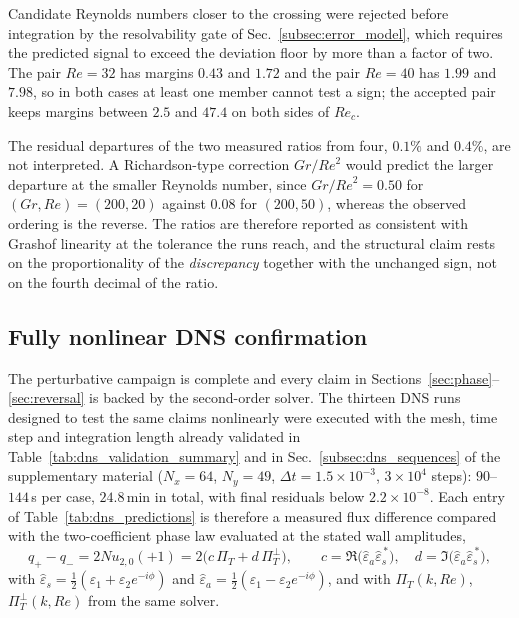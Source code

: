\documentclass[12pt,a4paper]{article}
\newcommand{\Rey}{\mathit{Re}}
\newcommand{\Grr}{\mathit{Gr}}
\newcommand{\Nu}{\mathit{Nu}}
\newcommand{\PiT}{\Pi_T}
\begin{document}
Candidate Reynolds numbers closer to the crossing
were rejected before integration by the resolvability gate of
Sec.~\ref{subsec:error_model}, which requires the predicted signal to exceed
the deviation floor by more than a
factor of two. The pair $\Rey=32$ has margins $0.43$ and $1.72$ and the pair
$\Rey=40$ has $1.99$ and $7.98$, so in both cases at least one member cannot
test a sign; the accepted pair keeps margins between $2.5$ and $47.4$ on both
sides of $\Rey_c$.

The residual departures of the two measured ratios from four, $0.1\%$ and $0.4\%$, are not
interpreted. A Richardson-type correction
$\Grr/\Rey^{2}$ would predict the larger departure at the smaller Reynolds
number, since $\Grr/\Rey^{2}=0.50$ for $(\Grr,\Rey)=(200,20)$ against $0.08$ for $(200,50)$,
whereas the observed ordering is the reverse. The ratios are therefore reported
as consistent with Grashof linearity at the tolerance the runs reach, and
the structural claim rests on the proportionality of the \emph{discrepancy}
together with the unchanged sign, not on the fourth decimal of the ratio.

\subsection{Fully nonlinear DNS confirmation}\label{sec:outlook}

The perturbative campaign is complete and every claim in
Sections~\ref{sec:phase}--\ref{sec:reversal} is backed by the second-order
solver. The thirteen DNS runs designed to test the same claims nonlinearly were
executed with the mesh, time step and integration length already validated in
Table~\ref{tab:dns_validation_summary} and in
Sec.~\ref{subsec:dns_sequences} of the supplementary material ($N_x=64$, $N_y=49$,
$\Delta t=1.5\times10^{-3}$, $3\times10^{4}$ steps): $90$--$144$\,s per case,
$24.8$\,min in total, with final residuals below $2.2\times10^{-8}$. Each entry
of Table~\ref{tab:dns_predictions} is therefore a measured flux difference
compared with the two-coefficient phase law evaluated at the stated wall
amplitudes,
\begin{equation}
  q_+-q_-=2\Nu_{2,0}(+1)=2\bigl(c\,\PiT+d\,\PiT^{\perp}\bigr),\qquad
  c=\Re\!\bigl(\widehat\varepsilon_a\widehat\varepsilon_s^{\,*}\bigr),\quad
  d=\Im\!\bigl(\widehat\varepsilon_a\widehat\varepsilon_s^{\,*}\bigr),
  \label{eq:dns_prediction_rule}
\end{equation}
with $\widehat\varepsilon_s=\tfrac12(\varepsilon_1+\varepsilon_2e^{-i\phi})$ and
$\widehat\varepsilon_a=\tfrac12(\varepsilon_1-\varepsilon_2e^{-i\phi})$, and with
$\PiT(k,\Rey)$, $\PiT^{\perp}(k,\Rey)$ from the same solver.
\end{document}
